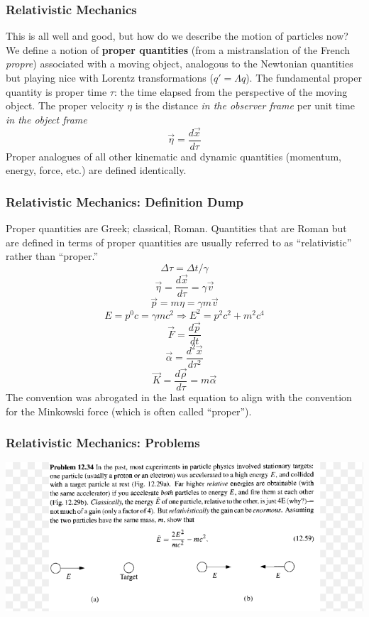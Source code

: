 \documentclass[10pt]{beamer}
\begin{document}
\begin{frame}
  \frametitle{Relativistic Mechanics}
  This is all well and good, but how do we describe the motion of particles now?
  We define a notion of \textbf{proper quantities} (from a mistranslation of the French \textit{propre}) associated with a moving object, analogous to the Newtonian quantities but playing nice with Lorentz transformations ($q' = \Lambda q$).
  The fundamental proper quantity is proper time $\tau$: the time elapsed from the perspective of the moving object.
  The proper velocity $\eta$ is the distance \textit{in the observer frame} per unit time \textit{in the object frame}
  \[
    \vec{\eta} = \frac{d\vec{x}}{d\tau}
  \]
  Proper analogues of all other kinematic and dynamic quantities (momentum, energy, force, etc.) are defined identically.
\end{frame}

\begin{frame}
  \frametitle{Relativistic Mechanics: Definition Dump}
  Proper quantities are Greek; classical, Roman.
  Quantities that are Roman but are defined in terms of proper quantities are usually referred to as ``relativistic'' rather than ``proper.''
  \[
    \Delta\tau = \Delta t/\gamma
  \]
  \[
    \vec{\eta} = \frac{d\vec{x}}{d\tau} = \gamma \vec{v}
  \]
  \[
    \vec{p} = m\eta = \gamma m\vec{v}
  \]
  \[
    E = p^{0}c = \gamma mc^{2} \Rightarrow E^{2}= p^{2}c^{2}+m^{2}c^{4}
  \]
  \[
    \vec{F} = \frac{d\vec{p}}{dt}
  \]
  \[
    \vec{\alpha} = \frac{d^{2}\vec{x}}{d\tau^{2}}
  \]
  \[
    \vec{K} = \frac{d\vec{\rho}}{d\tau} = m\vec{\alpha}
  \]
  The convention was abrogated in the last equation to align with the convention for the Minkowski force (which is often called ``proper'').
\end{frame}

\begin{frame}
  \frametitle{Relativistic Mechanics: Problems}
  \begin{center}
    \includegraphics[scale=0.3]{scattering.png}
  \end{center}
\end{frame}
\end{document}
